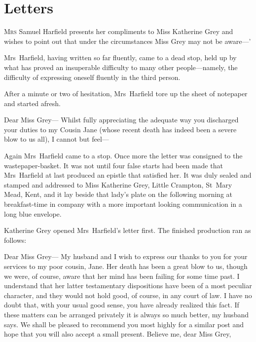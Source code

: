 \chapter{Letters}



\lettrine[ante=`]{M}{rs} Samuel Harfield presents her compliments to Miss Katherine Grey and wishes to point out that under the circumstances Miss Grey may not be aware—'

\zz
Mrs~Harfield, having written so far fluently, came to a dead stop, held up by what has proved an insuperable difficulty to many other people—namely, the difficulty of expressing oneself fluently in the third person.

After a minute or two of hesitation, Mrs~Harfield tore up the sheet of notepaper and started afresh.

\begin{mail}{}{Dear Miss Grey—}
	Whilst fully appreciating the adequate way you discharged your duties to my Cousin Jane (whose recent death has indeed been a severe blow to us all), I cannot but feel—
	\end{mail}

Again Mrs~Harfield came to a stop. Once more the letter was consigned to the wastepaper-basket. It was not until four false starts had been made that Mrs~Harfield at last produced an epistle that satisfied her. It was duly sealed and stamped and addressed to Miss Katherine Grey, Little Crampton, St~Mary Mead, Kent, and it lay beside that lady's plate on the following morning at breakfast-time in company with a more important looking communication in a long blue envelope.

Katherine Grey opened Mrs~Harfield's letter first. The finished production ran as follows:

\begin{mail}{}{Dear Miss Grey—}
	My husband and I wish to express our thanks to you for your services to my poor cousin, Jane. Her death has been a great blow to us, though we were, of course, aware that her mind has been failing for some time past. I understand that her latter testamentary dispositions have been of a most peculiar character, and they would not hold good, of course, in any court of law. I have no doubt that, with your usual good sense, you have already realized this fact. If these matters can be arranged privately it is always so much better, my husband says. We shall be pleased to recommend you most highly for a similar post and hope that you will also accept a small present. Believe me, dear Miss Grey, 
	
\end{mail}

